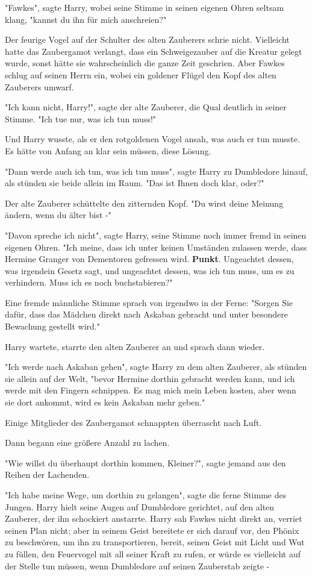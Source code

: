 {"Fawkes", sagte Harry, wobei seine Stimme in seinen eigenen Ohren seltsam klang, "kannst du ihn für mich anschreien?"

Der feurige Vogel auf der Schulter des alten Zauberers schrie nicht. Vielleicht hatte das Zaubergamot verlangt, dass ein Schweigezauber auf die Kreatur gelegt wurde, sonst hätte sie wahrscheinlich die ganze Zeit geschrien. Aber Fawkes schlug auf seinen Herrn ein, wobei ein goldener Flügel den Kopf des alten Zauberers umwarf.

"Ich kann nicht, Harry!", sagte der alte Zauberer, die Qual deutlich in seiner Stimme. "Ich tue nur, was ich tun muss!"

Und Harry wusste, als er den rotgoldenen Vogel ansah, was auch er tun musste. Es hätte von Anfang an klar sein müssen, diese Lösung.

"Dann werde auch ich tun, was ich tun muss", sagte Harry zu Dumbledore hinauf, als stünden sie beide allein im Raum. "Das ist Ihnen doch klar, oder?"

Der alte Zauberer schüttelte den zitternden Kopf. "Du wirst deine Meinung ändern, wenn du älter bist -"

"Davon spreche ich nicht", sagte Harry, seine Stimme noch immer fremd in seinen eigenen Ohren. "Ich meine, dass ich unter keinen Umständen zulassen werde, dass Hermine Granger von Dementoren gefressen wird. \textbf{Punkt}. Ungeachtet dessen, was irgendein Gesetz sagt, und ungeachtet dessen, was ich tun muss, um es zu verhindern. Muss ich es noch buchstabieren?"

Eine fremde männliche Stimme sprach von irgendwo in der Ferne: "Sorgen Sie dafür, dass das Mädchen direkt nach Askaban gebracht und unter besondere Bewachung gestellt wird."

Harry wartete, starrte den alten Zauberer an und sprach dann wieder.

"Ich werde nach Askaban gehen", sagte Harry zu dem alten Zauberer, als stünden sie allein auf der Welt, "bevor Hermine dorthin gebracht werden kann, und ich werde mit den Fingern schnippen. Es mag mich mein Leben kosten, aber wenn sie dort ankommt, wird es kein Askaban mehr geben."

Einige Mitglieder des Zaubergamot schnappten überrascht nach Luft.

Dann begann eine größere Anzahl zu lachen.

"Wie willst du überhaupt dorthin kommen, Kleiner?", sagte jemand aus den Reihen der Lachenden.

"Ich habe meine Wege, um dorthin zu gelangen", sagte die ferne Stimme des Jungen. Harry hielt seine Augen auf Dumbledore gerichtet, auf den alten Zauberer, der ihn schockiert anstarrte. Harry sah Fawkes nicht direkt an, verriet seinen Plan nicht; aber in seinem Geist bereitete er sich darauf vor, den Phönix zu beschwören, um ihn zu transportieren, bereit, seinen Geist mit Licht und Wut zu füllen, den Feuervogel mit all seiner Kraft zu rufen, er würde es vielleicht auf der Stelle tun müssen, wenn Dumbledore auf seinen Zauberstab zeigte -

}
